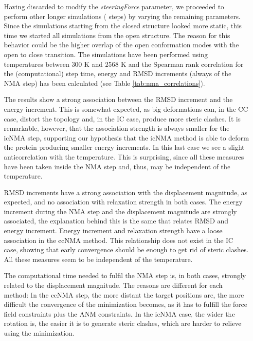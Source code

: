 Having discarded to modify the \textit{steeringForce} parameter, we proceeded to perform other longer simulations ( steps) by varying the remaining parameters. Since the simulations starting from the closed structure looked more static, this time we started all simulations from the open structure. The reason for this behavior could be the higher overlap of the open conformation modes with the open to close transition. The simulations have been performed using temperatures between 300 K and 2568 K and the Spearman rank correlation for the (computational) step time, energy and RMSD increments (always of the NMA step) has been calculated (see Table \ref{tab:nma_correlations}).      

\begin{center}

\end{center}

The results show a strong association between the RMSD increment and the energy increment. This is somewhat expected, as big deformations can, in the CC case, distort the topology and, in the IC case, produce more steric clashes. It is remarkable, however, that the association strength is always smaller for the icNMA step, supporting our hypothesis that the icNMA method is able to deform the protein producing smaller energy increments. In this last case we see a slight anticorrelation with the temperature. This is surprising, since all these measures have been taken inside the NMA step and, thus, may be independent of the temperature. 

RMSD increments have a strong association with the displacement magnitude, as expected, and no association with relaxation strength in both cases. The energy increment during the NMA step and the displacement magnitude are strongly associated, the explanation behind this is the same that relates RMSD and energy increment. Energy increment and relaxation strength have a loose association in the ccNMA method. This relationship does not exist in the IC case, showing that early convergence should be enough to get rid of steric clashes. All these measures seem to be independent of the temperature.
 
The computational time needed to fulfil the NMA step is, in both cases, strongly related to the displacement magnitude. The reasons are different for each method: In the ccNMA step, the more distant the target positions are, the more difficult the convergence of the minimization becomes, as it has to fulfill the force field constraints plus the ANM constraints. In the icNMA case, the wider the rotation is, the easier it is to generate steric clashes, which are harder to relieve using the minimization. 

